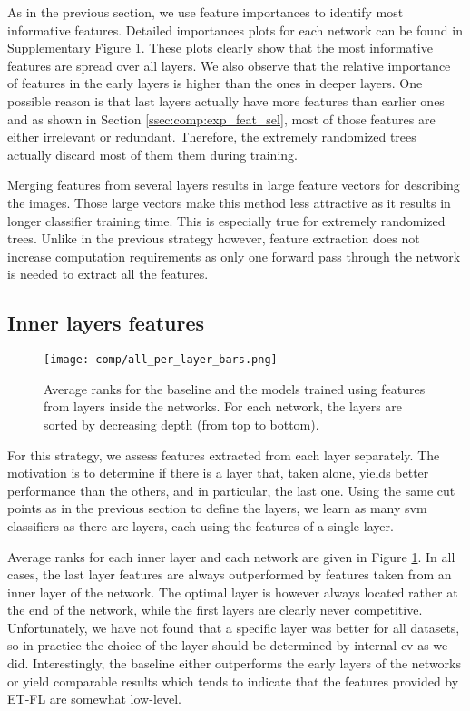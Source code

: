As in the previous section, we use feature importances to identify most informative features. Detailed importances plots for each network can be found in Supplementary Figure 1. These plots clearly show that the most informative features are spread over all layers. We also observe that the relative importance of features in the early layers is higher than the ones in deeper layers. One possible reason is that last layers actually have more features than earlier ones and as shown in Section \ref{ssec:comp:exp_feat_sel}, most of those features are either irrelevant or redundant. Therefore, the extremely randomized trees actually discard most of them them during training. 

Merging features from several layers results in large feature vectors for describing the images. Those large vectors make this method less attractive as it results in longer classifier training time. This is especially true for extremely randomized trees. Unlike in the previous strategy however, feature extraction does not increase computation requirements as only one forward pass through the network is needed to extract all the features.



\subsection{Inner layers features}
\label{ssec:comp:exp_inner_layers}

\begin{figure}
     \center 
     \texttt{[image: comp/all\_per\_layer\_bars.png]}
     \caption{Average ranks for the baseline and the models trained using features from layers inside the networks. For each network, the layers are sorted by decreasing depth (from top to bottom).}
     \label{fig:comp:res_avg_ranks_per_layer}
 \end{figure}
 
For this strategy, we assess features extracted from each layer separately. The motivation is to determine if there is a layer that, taken alone, yields better performance than the others, and in particular, the last one. Using the same cut points as in the previous section to define the layers, we learn as many \acrshort{svm} classifiers as there are layers, each using the features of a single layer.

Average ranks for each inner layer and each network are given in Figure \ref{fig:comp:res_avg_ranks_per_layer}. In all cases, the last layer features are always outperformed by features taken from an inner layer of the network. The optimal layer is however always located rather at the end of the network, while the first layers are clearly never competitive. Unfortunately, we have not found that a specific layer was better for all datasets, so in practice the choice of the layer should be determined by internal \acrlong{cv} as we did. Interestingly, the baseline either outperforms the early layers of the networks or yield comparable results which tends to indicate that the features provided by ET-FL are somewhat low-level.

